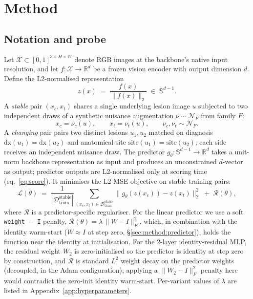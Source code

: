 \section{Method}
\label{sec:method}

\subsection{Notation and probe}
\label{sec:method:notation}

Let $\mathcal{X} \subset [0,1]^{3 \times H \times W}$ denote RGB images
at the backbone's native input resolution, and let $f : \mathcal{X}
\to \mathbb{R}^{d}$ be a frozen vision encoder with output dimension
$d$. Define the L2-normalised representation
\begin{equation}
  z(x) \;=\; \frac{f(x)}{\lVert f(x) \rVert_{2}} \;\in\; \mathbb{S}^{d-1}.
\end{equation}
A \emph{stable} pair $(x_{c}, x_{t})$ shares a single underlying lesion image
$u$ subjected to two independent draws of a synthetic nuisance augmentation
$\nu \sim \mathcal{N}_{F}$ from family $F$:
\begin{equation}
  x_{c} = \nu_{c}(u), \qquad x_{t} = \nu_{t}(u), \qquad \nu_{c}, \nu_{t} \sim \mathcal{N}_{F}.
\end{equation}
A \emph{changing} pair pairs two distinct lesions $u_{1}, u_{2}$ matched on
diagnosis $\mathrm{dx}(u_{1}) = \mathrm{dx}(u_{2})$ and anatomical site
$\mathrm{site}(u_{1}) = \mathrm{site}(u_{2})$; each side receives an
independent nuisance draw. The predictor
$g_{\theta} : \mathbb{S}^{d-1} \to \mathbb{R}^{d}$ takes a unit-norm
backbone representation as input and produces an unconstrained
$d$-vector as output; predictor outputs are L2-normalised only at
scoring time (eq.~\ref{eq:score}). It minimises the L2-MSE objective on
stable training pairs:
\begin{equation}
  \mathcal{L}(\theta) \;=\; \frac{1}{|\mathcal{D}_{\mathrm{train}}^{\mathrm{stable}}|}\!\!
  \sum_{(x_{c}, x_{t}) \in \mathcal{D}_{\mathrm{train}}^{\mathrm{stable}}}
  \lVert g_{\theta}(z(x_{c})) - z(x_{t}) \rVert_{2}^{2}
  \;+\; \mathcal{R}(\theta),
  \label{eq:loss}
\end{equation}
where $\mathcal{R}$ is a predictor-specific regulariser. For the linear
predictor we use a soft \texttt{weight $-$ I} penalty,
$\mathcal{R}(\theta) = \lambda \, \lVert W - I \rVert_{F}^{2}$, which, in
combination with the identity warm-start ($W \approx I$ at step zero,
\S\ref{sec:method:predictor}), holds the function near the identity at
initialisation. For the 2-layer identity-residual MLP, the residual
weight $W_{2}$ is zero-initialised so the predictor is identity at step
zero by construction, and $\mathcal{R}$ is standard $L^{2}$ weight decay
on the predictor weights (decoupled, in the Adam configuration);
applying a $\lVert W_{2} - I \rVert_{F}^{2}$ penalty here would
contradict the zero-init identity warm-start. Per-variant values of
$\lambda$ are listed in Appendix~\ref{app:hyperparameters}.

